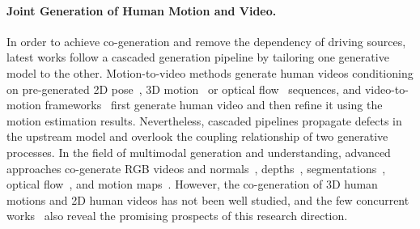 \paragraph{\bf Joint Generation of Human Motion and Video.} In order to achieve co-generation and remove the dependency of driving sources, latest works follow a cascaded generation pipeline by tailoring one generative model to the other. Motion-to-video methods generate human videos conditioning on pre-generated 2D pose~\cite{gan2025humandit,wang2025humandreamer,xi2025toward}, 3D motion~\cite{liu2025ponimator,nam2025cameo,li2025genhsi,wang2025mosa,huang2025movein2d} or optical flow~\cite{liao2025motionagent} sequences, and video-to-motion frameworks~\cite{liu2025revision} first generate human video and then refine it using the motion estimation results. Nevertheless, cascaded pipelines propagate defects in the upstream model and overlook the coupling relationship of two generative processes. In the field of multimodal generation and understanding, advanced approaches co-generate RGB videos and normals~\cite{xi2025omnivdiff,wang2025multianimate,wang2025mmgen}, depths~\cite{xi2025omnivdiff,wang2025multianimate,wang2025mmgen,xiong2025huprior3r,lu2025align3r,lu2025trackingworld,li2026unish,lu2026track4world}, segmentations~\cite{xi2025omnivdiff,wang2025mmgen}, optical flow~\cite{chefer2025videojam}, and motion maps~\cite{lei2025momaps}. However, the co-generation of 3D human motions and 2D human videos has not been well studied, and the few concurrent works~\cite{pang2025unimo,yang2025echomotion,lin2025vimogen} also reveal the promising prospects of this research direction.